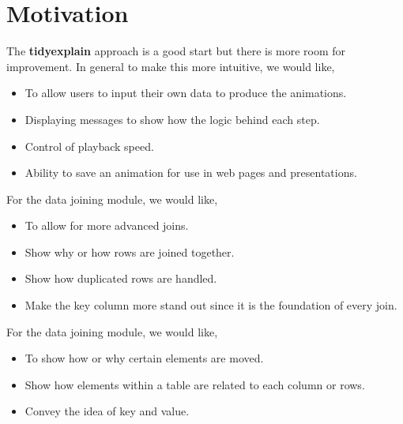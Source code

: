 \newpage 
\section{Motivation}
The \textbf{tidyexplain} approach is a good start but there is more room for improvement. In general to make this more intuitive, we would like,
\begin{itemize}
    \item To allow users to input their own data to produce the animations.
    \item Displaying messages to show how the logic behind each step.
    \item Control of playback speed.
    \item Ability to save an animation for use in web pages and presentations. 
\end{itemize}

For the data joining module, we would like,
\begin{itemize}
    \item To allow for more advanced joins.
    \item Show why or how rows are joined together.
    \item Show how duplicated rows are handled. 
    \item Make the key column more stand out since it is the foundation of every join.
\end{itemize}

\newline 

For the data joining module, we would like,
\begin{itemize}
    \item To show how or why certain elements are moved.
    \item Show how elements within a table are related to each column or rows. 
    \item Convey the idea of key and value.
\end{itemize}